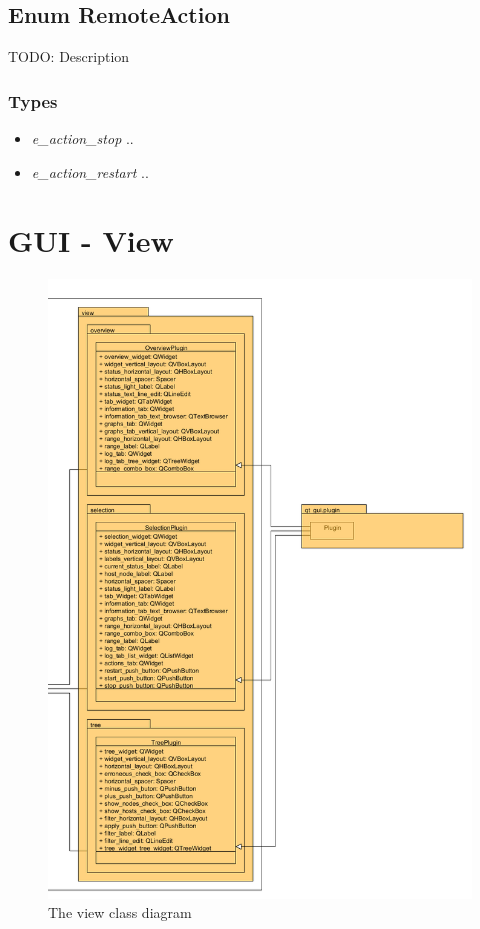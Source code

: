 \subsection{Enum RemoteAction}
TODO: Description
\subsubsection{Types}
\begin{itemize}
	\item \textit{e\_action\_stop}
	..
	\item \textit{e\_action\_restart}
	..
\end{itemize}

\newpage
\section{GUI - View}
\begin{figure}[!ht]
\begin{center}
\includegraphics[width=0.8\linewidth]{./bilder/view.png}
\caption{The view class diagram}
\end{center}
\end{figure}

